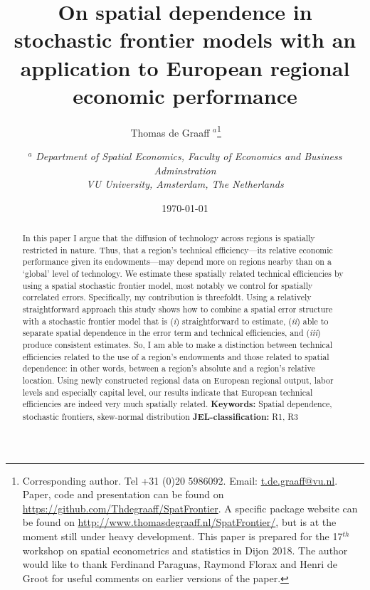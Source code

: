 \documentclass[11pt,parskip,abstracton,notitlepage]{scrartcl}
\begin{document}
%

\title{\bfseries On spatial dependence in stochastic frontier models with an application to European regional economic performance}
\author{Thomas de Graaff $^{a}$\thanks{Corresponding author. Tel +31 (0)20
    5986092. Email: \href{t.de.graaff@vu.nl}{t.de.graaff@vu.nl}. Paper, code and presentation can be found
    on
    \href{https://github.com/Thdegraaff/SpatFrontier}{https://github.com/Thdegraaff/SpatFrontier}. A specific package website can be found on \href{http://www.thomasdegraaff.nl/SpatFrontier/}{http://www.thomasdegraaff.nl/SpatFrontier/}, but is at the moment still under heavy development. This paper is prepared for the 17$^{th}$ workshop on spatial econometrics and statistics in Dijon 2018. The author would like to thank Ferdinand Paraguas, Raymond Florax and Henri de Groot for useful comments on earlier versions of the paper.} \bigskip \ \ \ 
\and 
{\small {$^{a}$ \emph{Department of Spatial Economics, Faculty of Economics and Business Adminstration}}} \\
{\small {\emph{VU University, Amsterdam, The Netherlands}}} \bigskip \\
}

\date{\today}
\maketitle
\clearpage

\begin{abstract}
\noindent In this paper I argue that the diffusion of technology across regions
is spatially restricted in nature. Thus, that a region's technical
efficiency---its relative economic performance given its endowments---may depend
more on regions nearby than on a `global' level of technology. We estimate these
spatially related technical efficiencies by using a spatial stochastic frontier
model, most notably we control for spatially correlated errors. Specifically, my
contribution is threefoldt.  Using a relatively straightforward approach this
study shows how to combine a spatial error structure with a stochastic frontier
model that is (\emph{i}) straightforward to estimate, (\emph{ii}) able to
separate spatial dependence in the error term and technical efficiencies, and
(\emph{iii}) produce consistent estimates. So, I am able to make a distinction between technical efficiencies related to the use of a region's endowments and those related to spatial dependence: in other words, between a region's absolute and a region's relative location. Using newly constructed regional data on European regional output, labor levels and especially capital level, our results indicate that European technical efficiencies are indeed very much spatially related.
\noindent 
\newline
\newline
{\small \textbf{Keywords:} Spatial dependence, stochastic frontiers, skew-normal distribution \newline
\textbf{JEL-classification:} R1, R3}
\end{abstract}
\thispagestyle{empty}
\end{document}
